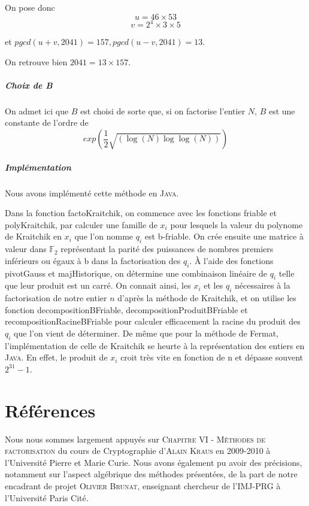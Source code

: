 \documentclass[11pt,a4paper]{article}
\begin{document}
 	On pose donc 
 	$$ u = 46 \times 53 $$ 
 	$$ v = 2^4 \times 3 \times 5$$
 	
 	et $pgcd(u+v, 2041) = 157, pgcd(u-v, 2041) = 13$.
 	
 	On retrouve bien $2041 = 13 \times 157$.
 	
 	
 	\subparagraph{Choix de B}
	
	On admet ici que $B$ est choisi de sorte que, si on factorise l'entier $N$, $B$ est une constante de l'ordre de 
	$$exp(\frac{1}{2} \sqrt{(\log(N) \log\log(N))})$$
		
	\subparagraph{Implémentation}
	Nous avons implémenté cette méthode en \textsc{Java}.

	Dans la fonction factoKraitchik, on commence avec les fonctions friable et polyKraitchik, par calculer une famille de $x_i$ pour lesquels la valeur du polynome de Kraitchik en $x_i$ que l'on nomme $q_i$ est b-friable. On crée ensuite une matrice à valeur dans $\mathbb{F}_2$ représentant la parité des puissances de nombres premiers inférieurs ou égaux à b dans la factorisation des $q_i$. À l'aide des fonctions pivotGauss et majHistorique, on détermine une combinaison linéaire de $q_i$ telle que leur produit est un carré. On connait ainsi, les $x_i$ et les $q_i$ nécessaires à la factorisation de notre entier $n$ d'après la méthode de Kraitchik, et on utilise les fonction decompositionBFriable, decompositionProduitBFriable et recompositionRacineBFriable pour calculer efficacement la racine du produit des $q_i$ que l'on vient de déterminer. De même que pour la méthode de Fermat, l'implémentation de celle de Kraitchik se heurte à la représentation des entiers en \textsc{Java}. En effet, le produit de $x_i$ croit très vite en fonction de n et dépasse souvent $2^{31} - 1$.
	
	
	\newpage
	\section{\LARGE{Références}}
	Nous nous sommes largement appuyés sur \textsc{Chapitre VI - Méthodes de factorisation} du cours de Cryptographie d'\textsc{Alain Kraus} en 2009-2010 à l'Université Pierre et Marie Curie. Nous avons également pu avoir des précisions, notamment sur l'aspect algébrique des méthodes présentées, de la part de notre encadrant de projet \textsc{Olivier Brunat}, enseignant chercheur de l'IMJ-PRG à l'Université Paris Cité.
	
\end{document}
